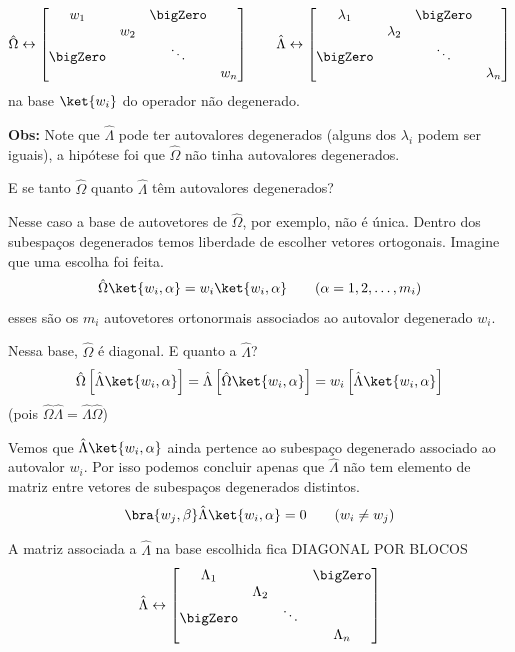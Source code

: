 \[
\hat{\Omega} \leftrightarrow
\begin{bmatrix}
w_1 & & \bigZero \\
& w_2 & \\
\bigZero & & \ddots \\
& & & w_n
\end{bmatrix}
\qquad
\hat{\Lambda} \leftrightarrow
\begin{bmatrix}
\lambda_1 & & \bigZero \\
& \lambda_2 & \\
\bigZero & & \ddots \\
& & & \lambda_n
\end{bmatrix}
\]
na base $\ket{w_i}$ do operador não degenerado.

\textbf{Obs:} Note que $\hat{\Lambda}$ pode ter autovalores degenerados (alguns dos $\lambda_i$ podem ser iguais), a hipótese foi que $\hat{\Omega}$ não tinha autovalores degenerados.

E se tanto $\hat{\Omega}$ quanto $\hat{\Lambda}$ têm autovalores degenerados?

Nesse caso a base de autovetores de $\hat{\Omega}$, por exemplo, não é única. Dentro dos subespaços degenerados temos liberdade de escolher vetores ortogonais. Imagine que uma escolha foi feita.
\begin{equation}
    \hat{\Omega}\ket{w_i, \alpha} = w_i \ket{w_i, \alpha} \qquad (\alpha = 1, 2, \dots, m_i)
\end{equation}
esses são os $m_i$ autovetores ortonormais associados ao autovalor degenerado $w_i$.

Nessa base, $\hat{\Omega}$ é diagonal. E quanto a $\hat{\Lambda}$?
\begin{equation}
    \hat{\Omega}\left[\hat{\Lambda}\ket{w_i, \alpha}\right] = \hat{\Lambda}\left[\hat{\Omega}\ket{w_i, \alpha}\right] = w_i \left[\hat{\Lambda}\ket{w_i, \alpha}\right]
\end{equation}
(pois $\hat{\Omega}\hat{\Lambda} = \hat{\Lambda}\hat{\Omega}$)

Vemos que $\hat{\Lambda}\ket{w_i,\alpha}$ ainda pertence ao subespaço degenerado associado ao autovalor $w_i$. Por isso podemos concluir apenas que $\hat{\Lambda}$ não tem elemento de matriz entre vetores de subespaços degenerados distintos.
\begin{equation}
    \bra{w_j, \beta} \hat{\Lambda} \ket{w_i, \alpha} = 0 \qquad (w_i \neq w_j)
\end{equation}

A matriz associada a $\hat{\Lambda}$ na base escolhida fica DIAGONAL POR BLOCOS
\[
\hat{\Lambda} \leftrightarrow
\begin{bmatrix}
\Lambda_1 & & & \bigZero \\
& \Lambda_2 & & \\
\bigZero & & \ddots & \\
& & & \Lambda_n
\end{bmatrix}
\]

